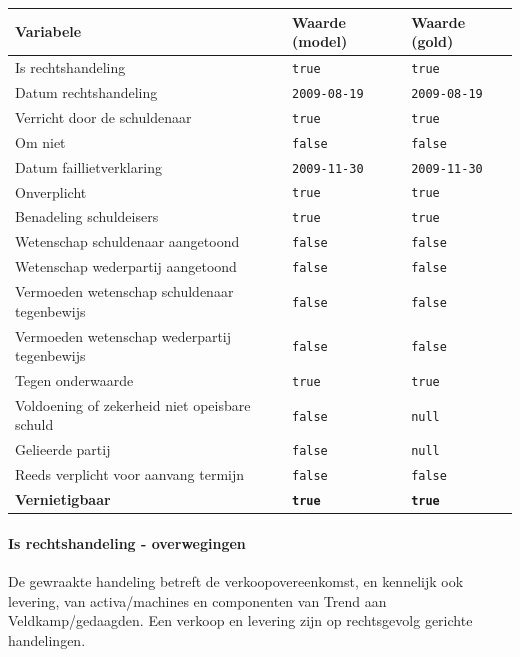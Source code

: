 \documentclass[
  dutch,
  a4paper,
]{article}
\begin{document}
\begin{center}
\small
\begin{tabular}{@{}p{7.4cm}p{2.6cm}p{2.6cm}@{}}
\toprule
Variabele & Waarde (model) & Waarde (gold) \\
\midrule
Is rechtshandeling & \texttt{true} & \texttt{true} \\
Datum rechtshandeling & \texttt{2009-08-19} & \texttt{2009-08-19} \\
Verricht door de schuldenaar & \texttt{true} & \texttt{true} \\
Om niet & \texttt{false} & \texttt{false} \\
Datum faillietverklaring & \texttt{2009-11-30} & \texttt{2009-11-30} \\
Onverplicht & \texttt{true} & \texttt{true} \\
Benadeling schuldeisers & \texttt{true} & \texttt{true} \\
Wetenschap schuldenaar aangetoond & \texttt{false} & \texttt{false} \\
Wetenschap wederpartij aangetoond & \texttt{false} & \texttt{false} \\
Vermoeden wetenschap schuldenaar tegenbewijs & \texttt{false} & \texttt{false} \\
Vermoeden wetenschap wederpartij tegenbewijs & \texttt{false} & \texttt{false} \\
Tegen onderwaarde & \texttt{true} & \texttt{true} \\
Voldoening of zekerheid niet opeisbare schuld & \texttt{false} & \texttt{null} \\
Gelieerde partij & \texttt{false} & \texttt{null} \\
Reeds verplicht voor aanvang termijn & \texttt{false} & \texttt{false} \\
\textbf{Vernietigbaar} & \textbf{\texttt{true}} & \textbf{\texttt{true}} \\
\bottomrule
\end{tabular}
\end{center}

\paragraph{Is rechtshandeling - overwegingen}\label{is-rechtshandeling---overwegingen-70}

De gewraakte handeling betreft de verkoopovereenkomst, en kennelijk ook levering, van activa/machines en componenten van Trend aan Veldkamp/gedaagden. Een verkoop en levering zijn op rechtsgevolg gerichte handelingen.
\end{document}
